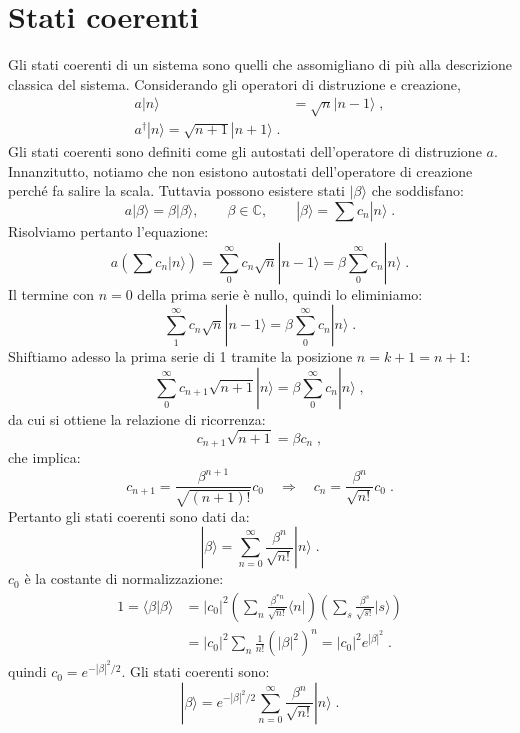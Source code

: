 \documentclass[12pt,a4paper]{report}
\theoremstyle{definition}
\numberwithin{equation}{section}
\newcommand{\bra}{\langle}
\newcommand{\ket}{\rangle}
\newcommand{\adj}[1]{#1^{\dagger}}
\begin{document}
\section{Stati coerenti}
Gli stati coerenti di un sistema sono quelli che assomigliano di più alla descrizione classica del sistema. Considerando gli operatori di distruzione e creazione,
\begin{align*}
a|n\ket &=\sqrt{n}|n-1\ket\;, \\
\adj{a}|n\ket=\sqrt{n+1}|n+1\ket\;.
\end{align*}
Gli stati coerenti sono definiti come gli autostati dell'operatore di distruzione $a$. Innanzitutto, notiamo che non esistono autostati dell'operatore di creazione perché fa salire la scala. Tuttavia possono esistere stati $|\beta\ket$ che soddisfano:
$$
a|\beta\ket=\beta|\beta\ket,\qquad \beta\in\mathbb{C},\qquad |\beta\ket=\sum c_n|n\ket\;.
$$
Risolviamo pertanto l'equazione:
\begin{equation}
a\left(\sum c_n|n\ket\right)= \sum_0^{\infty} c_n\sqrt{n}|n-1\ket=\beta\sum_0^{\infty} c_n|n\ket\;.
\end{equation}
Il termine con $n=0$ della prima serie è nullo, quindi lo eliminiamo:
$$
\sum_1^{\infty} c_n\sqrt{n}|n-1\ket=\beta\sum_0^{\infty} c_n|n\ket\;.
$$
Shiftiamo adesso la prima serie di 1 tramite la posizione $n=k+1=n+1$:
$$
\sum_0^{\infty} c_{n+1}\sqrt{n+1}|n\ket=\beta\sum_0^{\infty} c_n|n\ket\;,
$$
da cui si ottiene la relazione di ricorrenza:
\begin{equation}
c_{n+1}\sqrt{n+1}=\beta c_n\;,
\end{equation}
che implica:
\begin{equation}
c_{n+1}=\frac{\beta^{n+1}}{\sqrt{(n+1)!}}c_0\quad \Longrightarrow\quad c_n=\frac{\beta^n}{\sqrt{n!}}c_0\;.
\end{equation}
Pertanto gli stati coerenti sono dati da:
\begin{equation}
|\beta\ket=\sum_{n=0}^{\infty}\frac{\beta^n}{\sqrt{n!}}|n\ket\;.
\end{equation}
$c_0$ è la costante di normalizzazione:
\begin{align*}
1=\bra\beta|\beta\ket &= |c_0|^2\left(\sum_n \frac{\beta^{*n}}{\sqrt{n!}}\bra n|\right)\left(\sum_s \frac{\beta^s}{\sqrt{s!}}|s\ket\right) \\
&= |c_0|^2\sum_n \frac{1}{n!}(|\beta|^2)^n= |c_0|^2 e^{|\beta|^2}\;.
\end{align*}
quindi $c_0=e^{-|\beta|^2/2}$. Gli stati coerenti sono:
\begin{equation}
|\beta\ket=e^{-|\beta|^2/2}\sum_{n=0}^{\infty}\frac{\beta^n}{\sqrt{n!}}|n\ket\;.
\end{equation}
\end{document}
